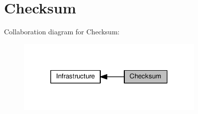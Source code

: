 \hypertarget{group__lwip__opts__checksum}{}\section{Checksum}
\label{group__lwip__opts__checksum}
Collaboration diagram for Checksum\+:
\nopagebreak
\begin{figure}[H]
\begin{center}
\leavevmode
\includegraphics[width=254pt]{group__lwip__opts__checksum}
\end{center}
\end{figure}
